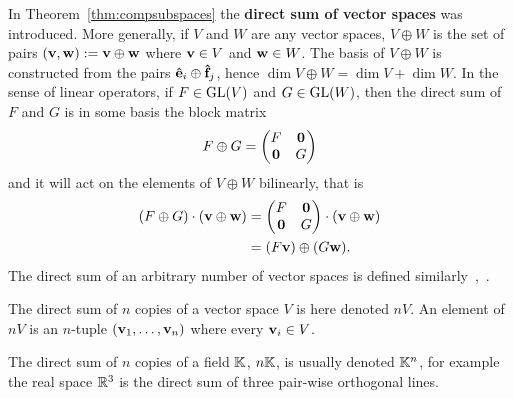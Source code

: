 In Theorem~\ref{thm:compsubspaces} the \textbf{direct sum of vector spaces} was introduced. More generally, if $V$ and $W$ are any vector spaces, $V \oplus W$ is the set of pairs $(\mathbf{v}, \mathbf{w}) := \mathbf{v} \oplus \mathbf{w}$ where $\mathbf{v} \in V$ and $\mathbf{w} \in W$. The basis of $V \oplus W$ is constructed from the pairs $\mathbf{\hat{e}}_i \oplus \mathbf{\hat{f}}_j$, hence $\dim V \oplus W = \dim V + \dim W$. In the sense of linear operators, if $F \in \text{GL}(V)$ and $G \in \text{GL}(W)$, then the direct sum of $F$ and $G$ is in some basis the block matrix
\begin{align*}
	F \oplus G = \begin{pmatrix}
	F & \mathbf{0} \\
	\mathbf{0} & G
\end{pmatrix}
\end{align*} and it will act on the elements of $V \oplus W$ bilinearly, that is 
	\begin{align*}
			(F \oplus G) \cdot (\mathbf{v} \oplus \mathbf{w}) &= \begin{pmatrix}
					F & \mathbf{0} \\
					\mathbf{0} & G
				\end{pmatrix} \cdot (\mathbf{v} \oplus \mathbf{w})  \\
			&= (F\mathbf{v}) \oplus (G \mathbf{w}).
		\end{align*} The direct sum of an arbitrary number of vector spaces is defined similarly~\cite[Sect.1.3.]{Serre},~\cite[Sect.1.5.]{Sagan}.
		
\begin{notation}
	The direct sum of $n$ copies of a vector space $V$ is here denoted $nV$.  An element of $nV$ is an $n$-tuple $(\mathbf{v}_1, \dots, \mathbf{v}_n)$ where every $\mathbf{v}_i \in V$.
\end{notation}

\begin{example}
	The direct sum of $n$ copies of a field $\mathbb{K}$, $n\mathbb{K}$, is usually denoted $\mathbb{K}^n$, for example the real space $\mathbb{R}^3$ is the direct sum of three pair-wise orthogonal lines.
\end{example}


